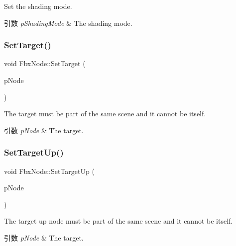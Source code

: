 Set the shading mode. 
\begin{DoxyParams}{引数}
{\em p\+Shading\+Mode} & The shading mode. \\
\hline
\end{DoxyParams}
\mbox{\label{class_fbx_node_af421a29f73f7de9f52061c2661569f16}} 
\subsubsection{\texorpdfstring{Set\+Target()}{SetTarget()}}
{\footnotesize\ttfamily void Fbx\+Node\+::\+Set\+Target (\begin{DoxyParamCaption}\item[{\hyperlink{class_fbx_node}{Fbx\+Node} $\ast$}]{p\+Node }\end{DoxyParamCaption})}

The target must be part of the same scene and it cannot be itself. 
\begin{DoxyParams}{引数}
{\em p\+Node} & The target. \\
\hline
\end{DoxyParams}
\mbox{\label{class_fbx_node_a1970908c54d4a64e8301c1445908c523}} 
\subsubsection{\texorpdfstring{Set\+Target\+Up()}{SetTargetUp()}}
{\footnotesize\ttfamily void Fbx\+Node\+::\+Set\+Target\+Up (\begin{DoxyParamCaption}\item[{\hyperlink{class_fbx_node}{Fbx\+Node} $\ast$}]{p\+Node }\end{DoxyParamCaption})}

The target up node must be part of the same scene and it cannot be itself. 
\begin{DoxyParams}{引数}
{\em p\+Node} & The target. \\
\hline
\end{DoxyParams}
\mbox{\label{class_fbx_node_a70fbe06cf416490205e21e9b79ae76ec}} 

